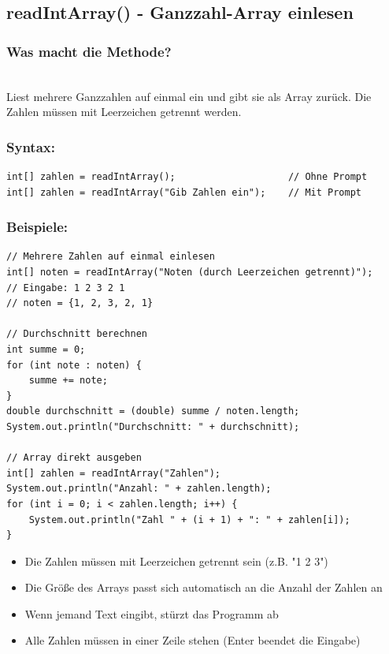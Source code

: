 \newpage


\subsection*{readIntArray() - Ganzzahl-Array einlesen}

\subsubsection*{Was macht die Methode?}\\
Liest mehrere Ganzzahlen auf einmal ein und gibt sie als Array zurück.
Die Zahlen müssen mit Leerzeichen getrennt werden.

\subsubsection*{Syntax:}
\begin{lstlisting}
int[] zahlen = readIntArray();                    // Ohne Prompt
int[] zahlen = readIntArray("Gib Zahlen ein");    // Mit Prompt
\end{lstlisting}

\subsubsection*{Beispiele:}
\begin{lstlisting}
// Mehrere Zahlen auf einmal einlesen
int[] noten = readIntArray("Noten (durch Leerzeichen getrennt)");
// Eingabe: 1 2 3 2 1
// noten = {1, 2, 3, 2, 1}

// Durchschnitt berechnen
int summe = 0;
for (int note : noten) {
    summe += note;
}
double durchschnitt = (double) summe / noten.length;
System.out.println("Durchschnitt: " + durchschnitt);

// Array direkt ausgeben
int[] zahlen = readIntArray("Zahlen");
System.out.println("Anzahl: " + zahlen.length);
for (int i = 0; i < zahlen.length; i++) {
    System.out.println("Zahl " + (i + 1) + ": " + zahlen[i]);
}
\end{lstlisting}

\begin{achtung}
	\begin{itemize}
		\item Die Zahlen müssen mit Leerzeichen getrennt sein (z.B. "1 2 3")
		\item Die Größe des Arrays passt sich automatisch an die Anzahl der Zahlen an
		\item Wenn jemand Text eingibt, stürzt das Programm ab
		\item Alle Zahlen müssen in einer Zeile stehen (Enter beendet die Eingabe)
	\end{itemize}
\end{achtung}

